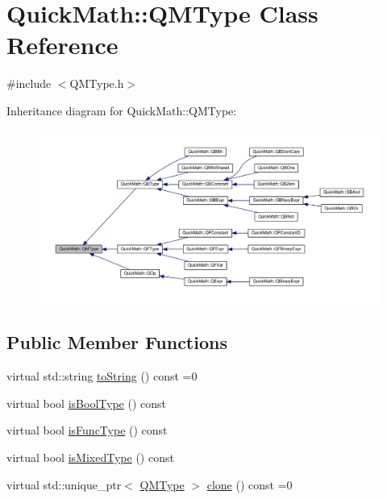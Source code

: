 \hypertarget{classQuickMath_1_1QMType}{}\section{Quick\+Math\+:\+:Q\+M\+Type Class Reference}
\label{classQuickMath_1_1QMType}


{\ttfamily \#include $<$Q\+M\+Type.\+h$>$}



Inheritance diagram for Quick\+Math\+:\+:Q\+M\+Type\+:
\nopagebreak
\begin{figure}[H]
\begin{center}
\leavevmode
\includegraphics[width=350pt]{classQuickMath_1_1QMType__inherit__graph}
\end{center}
\end{figure}
\subsection*{Public Member Functions}
\begin{DoxyCompactItemize}
\item 
virtual std\+::string \hyperlink{classQuickMath_1_1QMType_a031b83c87e4edae28c65adf8e268442b}{to\+String} () const =0
\item 
virtual bool \hyperlink{classQuickMath_1_1QMType_acb5baa3c93ea3cc6a25c358139b45dd5}{is\+Bool\+Type} () const 
\item 
virtual bool \hyperlink{classQuickMath_1_1QMType_ae9dc3e4b23d53df761e17625688ae404}{is\+Func\+Type} () const 
\item 
virtual bool \hyperlink{classQuickMath_1_1QMType_a79c2716bf5a6b20b9a5bcece2552300b}{is\+Mixed\+Type} () const 
\item 
virtual std\+::unique\+\_\+ptr$<$ \hyperlink{classQuickMath_1_1QMType}{Q\+M\+Type} $>$ \hyperlink{classQuickMath_1_1QMType_a15b2a74a662417da99c6da9b7aaeff77}{clone} () const =0
\end{DoxyCompactItemize}
